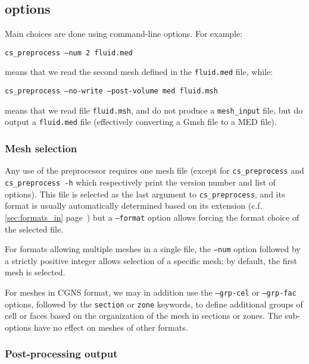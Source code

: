 {{{%
\subsection{\pcs options\label{sec:optpcs}}

Main choices are done using command-line options. For example:

\texttt{cs\_preprocess --num 2 fluid.med}

\noindent means that we read the second mesh defined in the
\texttt{fluid.med} file, while:

\texttt{cs\_preprocess --no-write --post-volume med fluid.msh}

\noindent means that we read file \texttt{fluid.msh}, and
do not produce a \texttt{mesh\_input}  file, but do output
a \texttt{fluid.med} file (effectively converting a Gmsh file to
a MED file).

\subsubsection{Mesh selection\label{sec:optpcs:mesh}}

Any use of the preprocessor requires one mesh file (except for
\texttt{cs\_preprocess} and \texttt{cs\_preprocess~-h} which respectively
print the version number and list of options).
This file is selected as the last argument to \texttt{cs\_preprocess},
and its format is usually automatically determined based on its
extension (c.f. \ref{sec:formats_in} page~\pageref{sec:formats_in})
but a \texttt{--format} option allows forcing the format choice of
the selected file.

For formats allowing multiple meshes in a single file, the
\texttt{--num} option followed by a strictly positive integer allows
selection of a specific mesh; by default, the first mesh is selected.

For meshes in CGNS format, we may in addition use the \texttt{--grp-cel}
or \texttt{--grp-fac} options, followed by the \texttt{section}
or \texttt{zone} keywords, to define additional groups of cell or faces
based on the organization of the mesh in sections or zones. The sub-options
have no effect on meshes of other formats.

\subsubsection{Post-processing output\label{sec:optpcs:post}}

}}}
